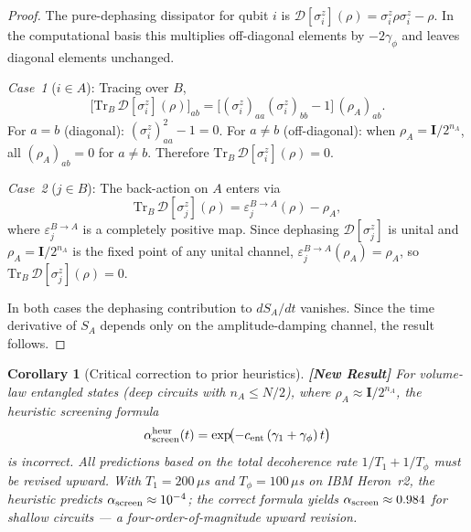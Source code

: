 \documentclass[12pt,letterpaper]{article}
\newtheorem{corollary}[theorem]{Corollary}
\theoremstyle{definition}
\theoremstyle{remark}
\newcommand{\newresult}{\textbf{[New Result]}}
\newcommand{\ascreen}{\alpha_{\rm screen}}
\newcommand{\gammaone}{\gamma_{1}}
\newcommand{\gammaphi}{\gamma_{\phi}}
\begin{document}
\begin{proof}
The pure-dephasing dissipator for qubit $i$ is
$\mathcal{D}[\sigma_i^z](\rho) = \sigma_i^z\rho\sigma_i^z - \rho$.
In the computational basis this multiplies off-diagonal elements by $-2\gammaphi$ and
leaves diagonal elements unchanged.

\textit{Case~1} ($i\in A$): Tracing over $B$,
\begin{equation}
\bigl[\mathrm{Tr}_B\,\mathcal{D}[\sigma_i^z](\rho)\bigr]_{ab}
  = \bigl[(\sigma_i^z)_{aa}(\sigma_i^z)_{bb} - 1\bigr]\,(\rho_A)_{ab}.
\end{equation}
For $a=b$ (diagonal): $(\sigma_i^z)_{aa}^2 - 1 = 0$.
For $a\ne b$ (off-diagonal): when $\rho_A = \mathbf{I}/2^{n_A}$, all
$(\rho_A)_{ab} = 0$ for $a\ne b$.
Therefore $\mathrm{Tr}_B\,\mathcal{D}[\sigma_i^z](\rho) = 0$.

\textit{Case~2} ($j\in B$): The back-action on $A$ enters via
\begin{equation}
\mathrm{Tr}_B\,\mathcal{D}[\sigma_j^z](\rho)
  = \varepsilon_j^{B\to A}(\rho) - \rho_A,
\end{equation}
where $\varepsilon_j^{B\to A}$ is a completely positive map.
Since dephasing $\mathcal{D}[\sigma_j^z]$ is unital and $\rho_A = \mathbf{I}/2^{n_A}$
is the fixed point of any unital channel, $\varepsilon_j^{B\to A}(\rho_A) = \rho_A$,
so $\mathrm{Tr}_B\,\mathcal{D}[\sigma_j^z](\rho) = 0$.

In both cases the dephasing contribution to $dS_A/dt$ vanishes.
Since the time derivative of $S_A$ depends only on the amplitude-damping channel, the
result follows.
\end{proof}

\begin{corollary}[Critical correction to prior heuristics] \label{cor:heuristic}
\newresult{}
For volume-law entangled states (deep circuits with $n_A\le N/2$), where
$\rho_A\approx\mathbf{I}/2^{n_A}$, the heuristic screening formula
\begin{equation}
\alpha_{\rm screen}^{\rm heur}(t)
  = \exp\!\bigl(-c_{\rm ent}\,(\gammaone+\gammaphi)\,t\bigr)
\end{equation}
is incorrect.  All predictions based on the total decoherence rate $1/T_1 + 1/T_\phi$
must be revised upward.
With $T_1 = 200\,\mu$s and $T_\phi = 100\,\mu$s on IBM Heron~r2, the heuristic
predicts $\ascreen\approx 10^{-4}$; the correct formula yields $\ascreen\approx 0.984$
for shallow circuits --- a four-order-of-magnitude upward revision.
\end{corollary}
\end{document}
